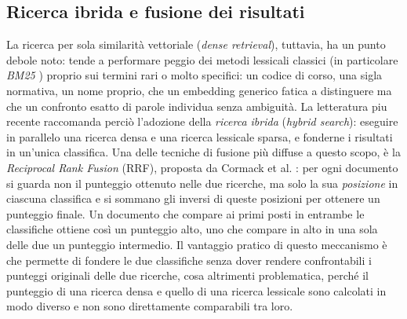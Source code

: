 \subsection{Ricerca ibrida e fusione dei risultati}

La ricerca per sola similarità vettoriale (\emph{dense retrieval}), tuttavia, ha un punto debole noto: tende a
performare peggio dei metodi lessicali classici (in particolare \emph{BM25} \cite{robertson2009bm25}) proprio sui termini rari o molto specifici: un codice di corso, una sigla normativa, un nome
proprio, che un embedding generico fatica a distinguere ma che un confronto esatto di parole individua senza
ambiguità. La letteratura piu recente raccomanda perciò l'adozione della \emph{ricerca ibrida} (\emph{hybrid search}): eseguire in parallelo una ricerca densa e una ricerca lessicale sparsa,
e fonderne i risultati in un'unica classifica. Una delle tecniche di fusione più diffuse a questo scopo,  è la \emph{Reciprocal Rank Fusion} (RRF), proposta da Cormack et al. \cite{cormack2009rrf}: per ogni documento si guarda non il punteggio ottenuto nelle due ricerche, ma solo la sua \emph{posizione} in ciascuna classifica e si sommano gli inversi di queste posizioni per ottenere un punteggio finale. Un documento che compare ai primi posti in entrambe le classifiche ottiene così un punteggio alto, uno che compare in alto in una sola delle due un punteggio intermedio. Il vantaggio pratico di questo meccanismo è che permette di fondere le due classifiche senza dover rendere confrontabili i punteggi originali delle due ricerche, cosa altrimenti problematica, perché il punteggio di una ricerca densa e quello di una ricerca lessicale sono calcolati in modo diverso e non sono direttamente comparabili tra loro.